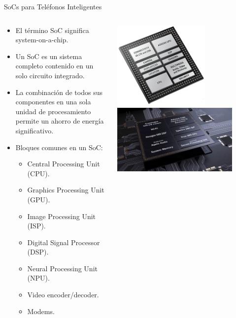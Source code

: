 \documentclass[pdf,
serif,
compress,
xcolor=table,
dvipsnames,
spanish,
aspectratio=169]{beamer}
\begin{document}
\begin{frame}{SoCs para Teléfonos Inteligentes}
\begin{columns}
\begin{column}{0.60\textwidth}  
\begin{itemize}
\item El término SoC significa system-on-a-chip.
\item Un SoC es un sistema completo contenido en un solo circuito integrado.
\item La combinación de todos sus componentes en una sola unidad de procesamiento permite un ahorro de energía significativo. 
\item Bloques comunes en un SoC:
\begin{itemize}
\item Central Processing Unit (CPU).
\item Graphics Processing Unit (GPU).
\item Image Processing Unit (ISP).
\item Digital Signal Processor (DSP).
\item Neural Processing Unit (NPU).
\item Video encoder/decoder.
\item Modems.
\end{itemize}
\end{itemize}
\end{column}
\begin{column}{0.40\textwidth}  
    \begin{center}
\includegraphics[width=0.65\textwidth]{FigsOpenGL/qualcomm_snapdragon410_block}\\
\includegraphics[width=0.85\textwidth]{FigsOpenGL/Snapdragon-855-1}
     \end{center}
\end{column}
\end{columns}
\end{frame}
\end{document}
